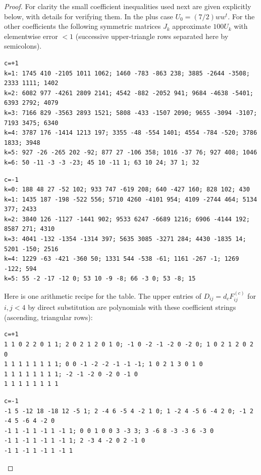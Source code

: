 \begin{proof}
For clarity the small coefficient inequalities used next are given explicitly below, with details for verifying them. In the plus case \(U_0=(7/2)ww^t\). For the other coefficients the following symmetric matrices \(J_k\) approximate \(100 U_k\) with elementwise error \(<1\) (successive upper-triangle rows separated here by semicolons).

{\scriptsize
\begin{verbatim}
c=+1
k=1: 1745 410 -2105 1011 1062; 1460 -783 -863 238; 3885 -2644 -3508; 2333 1111; 1402
k=2: 6082 977 -4261 2809 2141; 4542 -882 -2052 941; 9684 -4638 -5401; 6393 2792; 4079
k=3: 7166 829 -3563 2893 1521; 5808 -433 -1507 2090; 9655 -3094 -3107; 7193 3475; 6340
k=4: 3787 176 -1414 1213 197; 3355 -48 -554 1401; 4554 -784 -520; 3786 1833; 3948
k=5: 927 -26 -265 202 -92; 877 27 -106 358; 1016 -37 76; 927 408; 1046
k=6: 50 -11 -3 -3 -23; 45 10 -11 1; 63 10 24; 37 1; 32
\end{verbatim}
}

{\scriptsize
\begin{verbatim}
c=-1
k=0: 188 48 27 -52 102; 933 747 -619 208; 640 -427 160; 828 102; 430
k=1: 1435 187 -198 -522 556; 5710 4260 -4101 954; 4109 -2744 464; 5134 377; 2433
k=2: 3840 126 -1127 -1441 902; 9533 6247 -6689 1216; 6906 -4144 192; 8587 271; 4310
k=3: 4041 -132 -1354 -1314 397; 5635 3085 -3271 284; 4430 -1835 14; 5201 -150; 2516
k=4: 1229 -63 -421 -360 50; 1331 544 -538 -61; 1161 -267 -1; 1269 -122; 594
k=5: 55 -2 -17 -12 0; 53 10 -9 -8; 66 -3 0; 53 -8; 15
\end{verbatim}
}

Here is one arithmetic recipe for the table. The upper entries of \(D_{ij}=d_c F_{ij}^{(c)}\) for \(i,j<4\) by direct substitution are polynomials with these coefficient strings (ascending, triangular rows):

{\scriptsize
\begin{verbatim}
c=+1
1 1 0 2 2 0 1 1; 2 0 2 1 2 0 1 0; -1 0 -2 -1 -2 0 -2 0; 1 0 2 1 2 0 2 0
1 1 1 1 1 1 1 1; 0 0 -1 -2 -2 -1 -1 -1; 1 0 2 1 3 0 1 0
1 1 1 1 1 1 1 1; -2 -1 -2 0 -2 0 -1 0
1 1 1 1 1 1 1 1
\end{verbatim}
}

{\scriptsize
\begin{verbatim}
c=-1
-1 5 -12 18 -18 12 -5 1; 2 -4 6 -5 4 -2 1 0; 1 -2 4 -5 6 -4 2 0; -1 2 -4 5 -6 4 -2 0
-1 1 -1 1 -1 1 -1 1; 0 0 1 0 0 3 -3 3; 3 -6 8 -3 -3 6 -3 0
-1 1 -1 1 -1 1 -1 1; 2 -3 4 -2 0 2 -1 0
-1 1 -1 1 -1 1 -1 1
\end{verbatim}
}


\end{proof}
